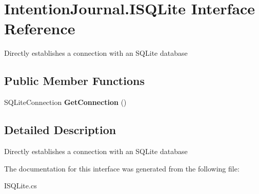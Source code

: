 \hypertarget{interface_intention_journal_1_1_i_s_q_lite}{}\section{Intention\+Journal.\+I\+S\+Q\+Lite Interface Reference}
\label{interface_intention_journal_1_1_i_s_q_lite}


Directly establishes a connection with an S\+Q\+Lite database  


\subsection*{Public Member Functions}
\begin{DoxyCompactItemize}
\item 
\mbox{\label{interface_intention_journal_1_1_i_s_q_lite_a1351e0b45f7305d7b2cd74dcaf28123c}} 
S\+Q\+Lite\+Connection {\bfseries Get\+Connection} ()
\end{DoxyCompactItemize}


\subsection{Detailed Description}
Directly establishes a connection with an S\+Q\+Lite database 



The documentation for this interface was generated from the following file\+:\begin{DoxyCompactItemize}
\item 
I\+S\+Q\+Lite.\+cs\end{DoxyCompactItemize}
